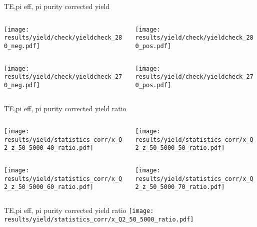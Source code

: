 \begin{frame}{TE,pi eff, pi purity corrected yield}
\begin{columns}
\begin{column}[T]{0.5\textwidth}
\texttt{[image: results/yield/check/yieldcheck\_280\_neg.pdf]}
\end{column}
\begin{column}[T]{0.5\textwidth}
\texttt{[image: results/yield/check/yieldcheck\_280\_pos.pdf]}
\end{column}
\end{columns}
\begin{columns}
\begin{column}[T]{0.5\textwidth}
\texttt{[image: results/yield/check/yieldcheck\_270\_neg.pdf]}
\end{column}
\begin{column}[T]{0.5\textwidth}
\texttt{[image: results/yield/check/yieldcheck\_270\_pos.pdf]}
\end{column}
\end{columns}
\end{frame}
\begin{frame}{TE,pi eff, pi purity corrected yield ratio}
\begin{columns}
\begin{column}[T]{0.5\textwidth}
\texttt{[image: results/yield/statistics\_corr/x\_Q2\_z\_50\_5000\_40\_ratio.pdf]}
\end{column}
\begin{column}[T]{0.5\textwidth}
\texttt{[image: results/yield/statistics\_corr/x\_Q2\_z\_50\_5000\_50\_ratio.pdf]}
\end{column}
\end{columns}
\begin{columns}
\begin{column}[T]{0.5\textwidth}
\texttt{[image: results/yield/statistics\_corr/x\_Q2\_z\_50\_5000\_60\_ratio.pdf]}
\end{column}
\begin{column}[T]{0.5\textwidth}
\texttt{[image: results/yield/statistics\_corr/x\_Q2\_z\_50\_5000\_70\_ratio.pdf]}
\end{column}
\end{columns}
\end{frame}
\begin{frame}{TE,pi eff, pi purity corrected yield ratio}
\texttt{[image: results/yield/statistics\_corr/x\_Q2\_50\_5000\_ratio.pdf]}
\end{frame}
